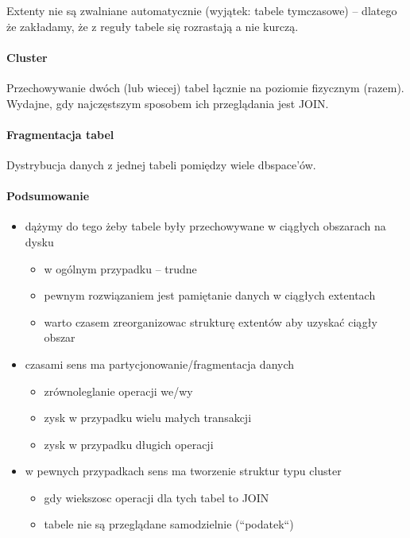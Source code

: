 \documentclass[12pt]{article}
\begin{document}
Extenty nie są zwalniane automatycznie (wyjątek: tabele tymczasowe) -- dlatego
że zakładamy, że z reguły tabele się rozrastają a nie kurczą.


\paragraph{Cluster}
Przechowywanie dwóch (lub wiecej) tabel łącznie na poziomie fizycznym (razem). Wydajne, gdy
najczęstszym sposobem ich przeglądania jest JOIN.



\paragraph{Fragmentacja tabel}
Dystrybucja danych z jednej tabeli pomiędzy wiele dbspace'ów.


\paragraph{Podsumowanie}
\begin{itemize}
\item dążymy do tego żeby tabele były przechowywane w ciągłych obszarach na dysku
\begin{itemize}
\item w ogólnym przypadku -- trudne
\item pewnym rozwiązaniem jest pamiętanie danych w ciągłych extentach
\item warto czasem zreorganizowac strukturę extentów aby uzyskać ciągły obszar
\end{itemize}
\item czasami sens ma partycjonowanie/fragmentacja danych
\begin{itemize}
\item zrównoleglanie operacji we/wy
\item zysk w przypadku wielu małych transakcji
\item zysk w przypadku długich operacji
\end{itemize}
\item w pewnych przypadkach sens ma tworzenie struktur typu cluster
\begin{itemize}
\item gdy wiekszosc operacji dla tych tabel to JOIN
\item tabele nie są przeglądane samodzielnie (``podatek``)
\end{itemize}
\end{itemize}
\end{document}
